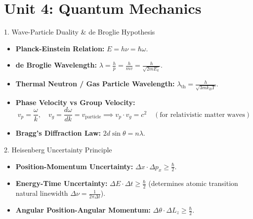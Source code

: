 \chapter{Unit 4: Quantum Mechanics}

\begin{formulabox}{1. Wave-Particle Duality \& de Broglie Hypothesis}
\begin{itemize}[leftmargin=*,itemsep=2pt]
    \item \textbf{Planck-Einstein Relation:} $E = h\nu = \hbar\omega$.
    \item \textbf{de Broglie Wavelength:} $\lambda = \frac{h}{p} = \frac{h}{m v} = \frac{h}{\sqrt{2m E_k}}$.
    \item \textbf{Thermal Neutron / Gas Particle Wavelength:} $\lambda_{\text{th}} = \frac{h}{\sqrt{3 m k_B T}}$.
    \item \textbf{Phase Velocity vs Group Velocity:}
    \[
    v_p = \frac{\omega}{k}, \quad v_g = \frac{d\omega}{dk} = v_{\text{particle}} \implies v_p \cdot v_g = c^2 \quad (\text{for relativistic matter waves})
    \]
    \item \textbf{Bragg's Diffraction Law:} $2d\sin\theta = n\lambda$.
\end{itemize}
\end{formulabox}

\begin{formulabox}{2. Heisenberg Uncertainty Principle}
\begin{itemize}[leftmargin=*,itemsep=2pt]
    \item \textbf{Position-Momentum Uncertainty:} $\Delta x \cdot \Delta p_x \ge \frac{\hbar}{2}$.
    \item \textbf{Energy-Time Uncertainty:} $\Delta E \cdot \Delta t \ge \frac{\hbar}{2}$ (determines atomic transition natural linewidth $\Delta\nu = \frac{1}{2\pi \Delta t}$).
    \item \textbf{Angular Position-Angular Momentum:} $\Delta \theta \cdot \Delta L_z \ge \frac{\hbar}{2}$.
\end{itemize}
\end{formulabox}

